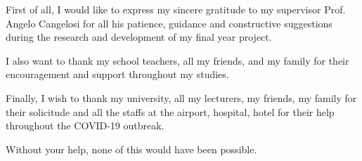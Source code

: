 First of all, I would like to express my sincere gratitude to my supervisor Prof. Angelo Cangelosi 
for all his patience, guidance and constructive suggestions during the research and 
development of my final year project. 

I also want to thank my school teachers, all my friends, and my family for their 
encouragement and support throughout my studies. 

Finally, I wish to thank my university, all my lecturers, my friends, 
my family for their solicitude and all the staffs at the airport, hospital, hotel 
for their help throughout the COVID-19 outbreak.

Without your help, none of this would have been possible.


